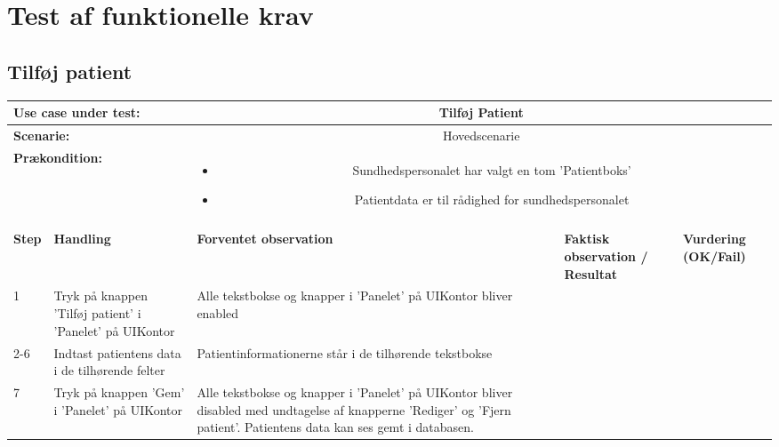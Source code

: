 \section{Test af funktionelle krav}
\subsection{Tilføj patient}
\begin{tabular}{|p{1cm}|p{3cm}|p{4cm}|p{4cm}|p{2cm}|}
\hline
\multicolumn{2}{|p{4cm}|}{\textbf{Use case under test:}} & \multicolumn{3}{c|}{Tilføj Patient} \\\hline

\multicolumn{2}{|p{3cm}|}{\textbf{Scenarie:}} & \multicolumn{3}{c|}{Hovedscenarie} \\\hline

\multicolumn{2}{|p{3cm}|}{\textbf{Prækondition:}}  & \multicolumn{3}{c|}{\parbox{0.8\textwidth}{
\begin{itemize}[label=$\circ$]
\item Sundhedspersonalet har valgt en tom 'Patientboks' 
\item Patientdata er til rådighed for sundhedspersonalet 
\end{itemize} }}\\\hline

\multicolumn{5}{|c|}{} \\\hline

\textbf{Step} & \textbf{Handling} & \textbf{Forventet observation} & \textbf{Faktisk observation / Resultat} & \textbf{Vurdering (OK/Fail)}\\\hline

1 & Tryk på knappen 'Tilføj patient' i 'Panelet' på UIKontor & Alle tekstbokse og knapper i 'Panelet' på UIKontor bliver enabled & & \\\hline

2-6 & Indtast patientens data i de tilhørende felter & Patientinformationerne står i de tilhørende tekstbokse & & \\\hline

7 & Tryk på knappen 'Gem' i 'Panelet' på UIKontor & Alle tekstbokse og knapper i 'Panelet' på UIKontor bliver disabled med undtagelse af knapperne 'Rediger' og 'Fjern patient'. Patientens data kan ses gemt i databasen. & & \\\hline

\end{tabular}
\\
